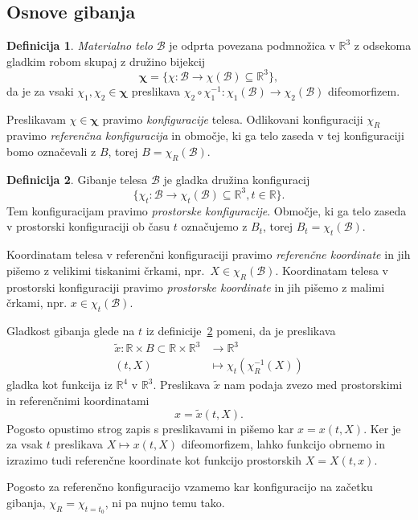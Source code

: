 \documentclass[12pt,a4paper,twoside]{article}
\theoremstyle{definition} %
\newtheorem{definicija}{Definicija}[section]
\theoremstyle{plain} %
\numberwithin{equation}{section}
\newcommand{\R}{\mathbb R}
\newcommand{\B}{\mathcal{B}}
\renewcommand{\b}{\boldsymbol}
\newcommand{\vX}{X}
\newcommand{\vx}{x}
\begin{document}
\subsection{Osnove gibanja}

\begin{definicija}
  \emph{Materialno telo} $\B$ je odprta povezana podmnožica v $\R^3$ z odsekoma gladkim
  robom skupaj z družino bijekcij
  \[
    \b\chi = \{\chi \colon\B\to\chi(\B) \subseteq \R^3\},
  \]
  da je za vsaki $\chi_1, \chi_2 \in \b\chi$ preslikava
  $\chi_2\circ\chi_1^{-1}\colon \chi_1(\B) \to \chi_2(\B)$
  difeomorfizem.

  Preslikavam $\chi \in \b\chi$ pravimo \emph{konfiguracije} telesa. Odlikovani
  konfiguraciji $\chi_R$ pravimo \emph{referenčna konfiguracija} in območje, ki
  ga telo zaseda v tej konfiguraciji bomo označevali z $B$, torej $B =
  \chi_R(\B)$.
\end{definicija}

\begin{definicija}
  \label{def:gibanje}
  Gibanje telesa $\B$ je gladka družina konfiguracij
  \[
    \{\chi_t\colon \B \to\chi_t(\B) \subseteq \R^3, t \in \R\}.
  \]
  Tem konfiguracijam pravimo \emph{prostorske konfiguracije}. Območje, ki ga
  telo zaseda v prostorski konfiguraciji ob času $t$ označujemo z $B_t$, torej
  $B_t = \chi_t(\B)$.
\end{definicija}
Koordinatam telesa v referenčni konfiguraciji pravimo \emph{referenčne
koordinate} in jih pišemo z velikimi tiskanimi črkami, npr.\ $\vX \in \chi_R(\B)$.
Koordinatam telesa v prostorski konfiguraciji pravimo \emph{prostorske
koordinate} in jih pišemo z malimi črkami, npr. $\vx \in \chi_t(\B)$.

Gladkost gibanja glede na $t$ iz definicije~\ref{def:gibanje} pomeni, da je
preslikava
\begin{align*}
  \tilde{x}\colon \R \times B \subset \R \times \R^3&\to \R^3 \\
  (t, \vX) &\mapsto \chi_t(\chi_R^{-1}(\vX))
\end{align*}
gladka kot funkcija iz $\R^4$ v $\R^3$.
Preslikava $\tilde x$ nam podaja zvezo med prostorskimi in referenčnimi
koordinatami
\[
  \vx = \tilde x(t, \vX).
\]
Pogosto opustimo strog zapis s preslikavami in pišemo kar $\vx = \vx(t, \vX)$.
Ker je za vsak $t$ preslikava $\vX \mapsto \vx(t, \vX)$ difeomorfizem, lahko funkcijo
obrnemo in izrazimo tudi referenčne koordinate kot funkcijo prostorskih $\vX = \vX(t, \vx)$.

Pogosto za referenčno konfiguracijo vzamemo kar konfiguracijo na začetku
gibanja, $\chi_R = \chi_{t=t_0}$, ni pa nujno temu tako.
\end{document}
